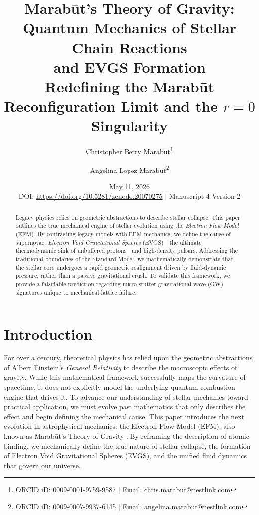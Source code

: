 \documentclass[11pt, a4paper]{article}
\title{\textbf{Marab\={u}t's Theory of Gravity: \\ Quantum Mechanics of Stellar Chain Reactions \\ and EVGS Formation} \\[1em] \large{Redefining the Marabūt Reconfiguration Limit and the $r=0$ Singularity}}
\author[1]{Christopher Berry Marab\={u}t\thanks{ORCID iD: \href{https://orcid.org/0009-0001-9759-9587}{0009-0001-9759-9587} | Email: chris.marabut@nestlink.com}}
\author[1]{Angelina Lopez Marab\={u}t\thanks{ORCID iD: \href{https://orcid.org/0009-0007-9937-6145}{0009-0007-9937-6145} | Email: angelina.marabut@nestlink.com}}
\affil[1]{Independent Researchers}
\date{May 11, 2026 \\[1.5em] \small{DOI: \url{https://doi.org/10.5281/zenodo.20070275} $|$ Manuscript 4 Version 2}}
\begin{document}

\maketitle

\begin{abstract}
  Legacy physics relies on geometric abstractions to describe stellar collapse. This paper outlines the true mechanical engine of stellar evolution using the \textit{Electron Flow Model} (EFM). By contrasting legacy models with EFM mechanics, we define the cause of supernovae, \textit{Electron Void Gravitational Spheres} (EVGS)---the ultimate thermodynamic sink of unbuffered protons---and high-density pulsars. Addressing the traditional boundaries of the Standard Model, we mathematically demonstrate that the stellar core undergoes a rapid geometric realignment driven by fluid-dynamic pressure, rather than a passive gravitational crush. To validate this framework, we provide a falsifiable prediction regarding micro-stutter gravitational wave (GW) signatures unique to mechanical lattice failure.
\end{abstract}

\section{Introduction}
  For over a century, theoretical physics has relied upon the geometric abstractions of Albert Einstein's \textit{General Relativity} to describe the macroscopic effects of gravity. While this mathematical framework successfully maps the curvature of spacetime, it does not explicitly model the underlying quantum combustion engine that drives it. To advance our understanding of stellar mechanics toward practical application, we must evolve past mathematics that only describes the effect and begin defining the mechanical cause. This paper introduces the next evolution in astrophysical mechanics: the Electron Flow Model (EFM), also known as Marab\={u}t's Theory of Gravity \cite{marabut2026m1}. By reframing the description of atomic binding, we mechanically define the true nature of stellar collapse, the formation of Electron Void Gravitational Spheres (EVGS), and the unified fluid dynamics that govern our universe.
\end{document}
